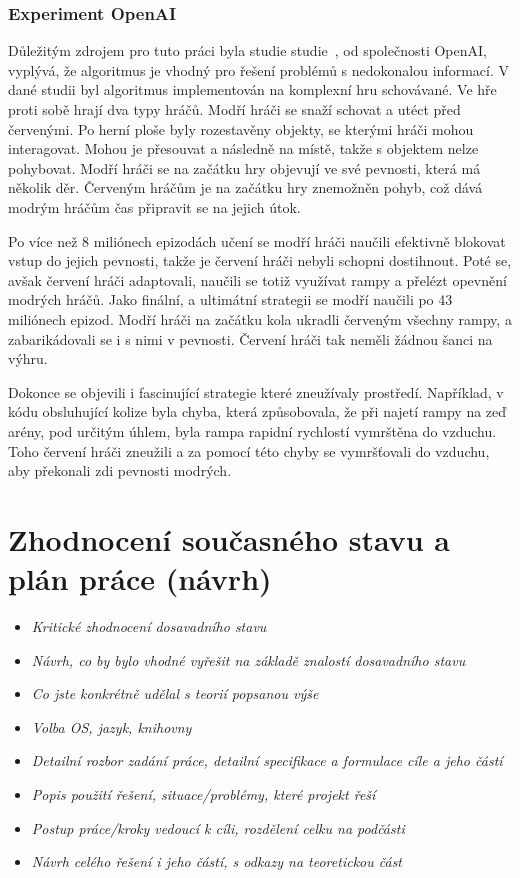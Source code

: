 \subsection{Experiment OpenAI}\label{subsec:experiment-openai}
Důležitým zdrojem pro tuto práci byla studie studie~\cite{PPO_Hide_Seek_paper}, od společnosti OpenAI, vyplývá, že algoritmus je vhodný pro řešení problémů s nedokonalou informací.
V dané studii byl algoritmus implementován na komplexní hru schovávané.
Ve hře proti sobě hrají dva typy hráčů.
Modří hráči se snaží schovat a utéct před červenými.
Po herní ploše byly rozestavěny objekty, se kterými hráči mohou interagovat.
Mohou je přesouvat a následně  na místě, takže s objektem nelze pohybovat.
Modří hráči se na začátku hry objevují ve své pevnosti, která má několik děr.
Červeným hráčům je na začátku hry znemožněn pohyb, což dává modrým hráčům čas připravit se na jejich útok.

Po více než 8 miliónech epizodách učení se modří hráči naučili efektivně blokovat vstup do jejich pevnosti, takže je červení hráči nebyli schopni dostihnout.
Poté se, avšak červení hráči adaptovali, naučili se totiž využívat rampy a přelézt opevnění modrých hráčů.
Jako finální, a ultimátní strategii se modří naučili po 43 miliónech epizod.
Modří hráči na začátku kola ukradli červeným všechny rampy, a zabarikádovali se i s nimi v pevnosti.
Červení hráči tak neměli žádnou šanci na výhru.

Dokonce se objevili i fascinující strategie které zneužívaly prostředí.
Například, v kódu obsluhující kolize byla chyba, která způsobovala, že při najetí rampy na zeď arény, pod určitým úhlem, byla rampa rapidní rychlostí vymrštěna do vzduchu.
Toho červení hráči zneužili a za pomocí této chyby se vymršťovali do vzduchu, aby překonali zdi pevnosti modrých.

\chapter{Zhodnocení současného stavu a plán práce (návrh)}
\label{ch:navrh}
\begin{itemize}
  \item \emph {Kritické zhodnocení dosavadního stavu}
  \item \emph {Návrh, co by bylo vhodné vyřešit na základě znalostí dosavadního stavu}
  \item \emph {Co jste konkrétně udělal s teorií popsanou výše}
  \item \emph {Volba OS, jazyk, knihovny}
  \item \emph {Detailní rozbor zadání práce, detailní specifikace a formulace cíle a jeho částí}
  \item \emph {Popis použití řešení, situace/problémy, které projekt řeší}
  \item \emph {Postup práce/kroky vedoucí k cíli, rozdělení celku na podčásti}
  \item \emph {Návrh celého řešení i jeho částí, s odkazy na teoretickou část}
\end{itemize}

